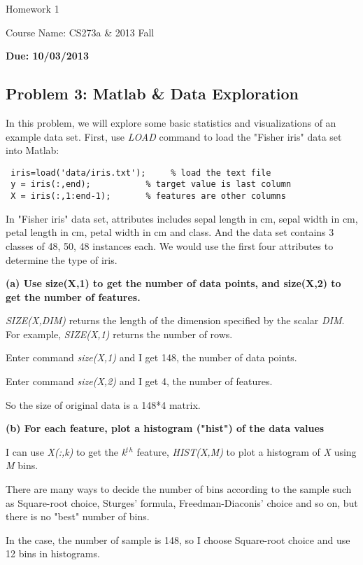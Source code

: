 \documentclass[twoside,11pt]{article}
\theoremstyle{definition}
\begin{document}
\centerline{\Large Homework 1}
\centerline{Course Name: CS273a \& 2013 Fall}
\centerline{\bf Due: 10/03/2013}

\vspace{3ex}

\subsection*{Problem 3: Matlab \& Data Exploration}
In this problem, we will explore some basic statistics and visualizations of an example data set.
First, use \textit{LOAD} command to load the "Fisher iris" data set into Matlab:
\begin{lstlisting}
 iris=load('data/iris.txt');     % load the text file
 y = iris(:,end);           % target value is last column
 X = iris(:,1:end-1);       % features are other columns
\end{lstlisting}

In "Fisher iris" data set, attributes includes sepal length in cm, sepal width in cm, petal length in cm, petal width in cm and class. And the data set contains 3 classes of 48, 50, 48 instances each. We would use the first four attributes to determine the type of iris.

\vspace{3ex}
\textbf{(a) Use size(X,1) to get the number of data points, and size(X,2) to get the number of features.}

\textit{SIZE(X,DIM)} returns the length of the dimension specified by the scalar \textit{DIM}.  For example, \textit{SIZE(X,1)} returns the number of rows.

Enter command \textit{size(X,1)} and I get 148, the number of data points.

Enter command \textit{size(X,2)} and I get 4, the number of features.

So the size of original data is a 148*4 matrix.

\vspace{3ex}
\textbf{(b) For each feature, plot a histogram ("hist") of the data values}

I can use \textit{X(:,k)} to get the \textit{k$^t$$^h$} feature, \textit{HIST(X,M)} to plot a histogram of \textit{X} using \textit{M} bins.

There are many ways to decide the number of bins according to the sample such as Square-root choice, Sturges' formula, Freedman-Diaconis' choice and so on, but there is no "best" number of bins.

In the case, the number of sample is 148, so I choose Square-root choice and use 12 bins in histograms.
\end{document}
